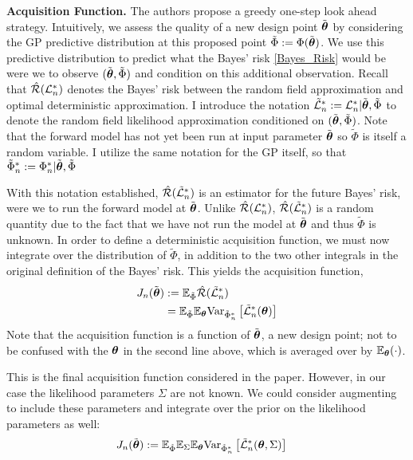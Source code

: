 \documentclass[12pt]{article}
\begin{document}
\bigskip
\noindent
\textbf{Acquisition Function.}
The authors propose a greedy one-step look ahead strategy. Intuitively, we assess the quality of a new design point $\tilde{\boldsymbol{\theta}}$ by considering the GP predictive distribution 
at this proposed point $\tilde{\Phi} := \Phi(\tilde{\boldsymbol{\theta}})$. We use this predictive distribution to predict what the Bayes' risk \ref{Bayes_Risk} would be were we to observe 
$(\tilde{\boldsymbol{\theta}}, \tilde{\Phi})$ and condition on this additional observation. Recall that $\hat{\mathcal{R}}(\mathcal{L}_n^*)$ denotes the Bayes' risk between the 
random field approximation and optimal deterministic approximation. I introduce the notation $\tilde{\mathcal{L}}^*_n := \mathcal{L}^*_n|\tilde{\boldsymbol{\theta}}, \tilde{\Phi}$ to denote the 
random field likelihood approximation conditioned on $(\tilde{\boldsymbol{\theta}}, \tilde{\Phi})$. Note that the forward model has not yet been run at input parameter $\tilde{\boldsymbol{\theta}}$ so 
$\tilde{\Phi}$ is itself a random variable. I utilize the same notation for the GP itself, so that $\tilde{\Phi}^*_n := \Phi^*_n|\tilde{\boldsymbol{\theta}}, \tilde{\Phi}$

With this notation established, $\hat{\mathcal{R}}(\tilde{\mathcal{L}}^*_n)$ is an estimator for the future Bayes' risk, were we 
to run the forward model at $\tilde{\boldsymbol{\theta}}$. Unlike $\hat{\mathcal{R}}(\mathcal{L}^*_n)$, $\hat{\mathcal{R}}(\tilde{\mathcal{L}}^*_n)$ is a random quantity due to the fact that 
we have not run the model at $\tilde{\boldsymbol{\theta}}$ and thus $\tilde{\Phi}$ is unknown. In order to define a deterministic acquisition function, we must now integrate over the distribution of $\tilde{\Phi}$, in addition to the two other 
integrals in the original definition of the Bayes' risk. This yields the acquisition function, 
\begin{align}
J_n(\tilde{\boldsymbol{\theta}}) &:=  \mathbb{E}_{\tilde{\Phi}} \hat{\mathcal{R}}(\tilde{\mathcal{L}}^*_n) \\ 
			     &= \mathbb{E}_{\tilde{\Phi}} \mathbb{E}_{\boldsymbol{\theta}} \mathrm{Var}_{\tilde{\Phi}_n^*}\left[\tilde{\mathcal{L}}_n^*(\boldsymbol{\theta}) \right]
\end{align}
Note that the acquisition function is a function of $\tilde{\boldsymbol{\theta}}$, a new design point; not to be confused with the $\boldsymbol{\theta}$ in the second line above, which is averaged over by 
$\mathbb{E}_{\boldsymbol{\theta}}(\cdot)$. 

This is the final acquisition function considered in the paper. However, in our case the likelihood parameters $\Sigma$ are not known. We could consider augmenting to include these 
parameters and integrate over the prior on the likelihood parameters as well: 
\begin{align}
J_n(\tilde{\boldsymbol{\theta}}) &:= \mathbb{E}_{\tilde{\Phi}} \mathbb{E}_{\Sigma} \mathbb{E}_{\boldsymbol{\theta}} \mathrm{Var}_{\tilde{\Phi}_n^*}\left[\tilde{\mathcal{L}}_n^*(\boldsymbol{\theta}, \Sigma) \right]
\end{align}
\end{document}
